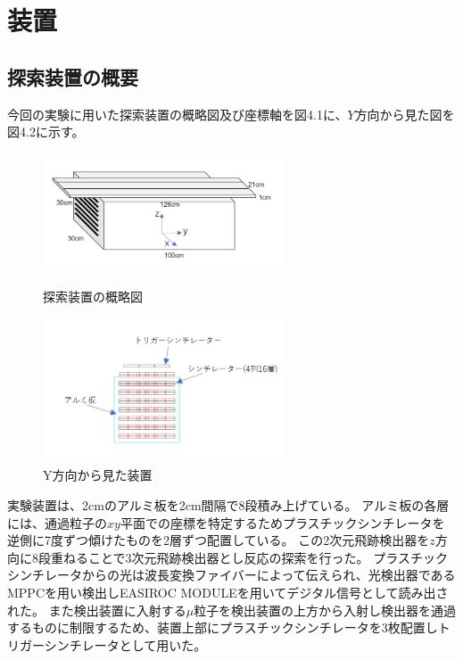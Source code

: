 \chapter{装置} \label{equipment}
\section{探索装置の概要}
今回の実験に用いた探索装置の概略図及び座標軸を図4.1に、$Y$方向から見た図を図4.2に示す。

\begin{figure}[H]
    \begin{minipage}[b]{0.47\linewidth}
        \centering
        \includegraphics[height=3.5cm]{img/equipment.jpg}
        \caption{探索装置の概略図}
    \end{minipage}
    \begin{minipage}[b]{0.47\linewidth}
        \centering
        \includegraphics[height=4.3cm]{img/equipment_y.jpg}
        \caption{Y方向から見た装置}
    \end{minipage}
\end{figure}

実験装置は、2cmのアルミ板を2cm間隔で8段積み上げている。
アルミ板の各層には、通過粒子の$xy$平面での座標を特定するためプラスチックシンチレータを逆側に7度ずつ傾けたものを2層ずつ配置している。
この2次元飛跡検出器を$z$方向に8段重ねることで3次元飛跡検出器とし反応の探索を行った。
プラスチックシンチレータからの光は波長変換ファイバーによって伝えられ、光検出器であるMPPCを用い検出しEASIROC MODULEを用いてデジタル信号として読み出された。
また検出装置に入射する$\mu$粒子を検出装置の上方から入射し検出器を通過するものに制限するため、装置上部にプラスチックシンチレータを3枚配置しトリガーシンチレータとして用いた。


